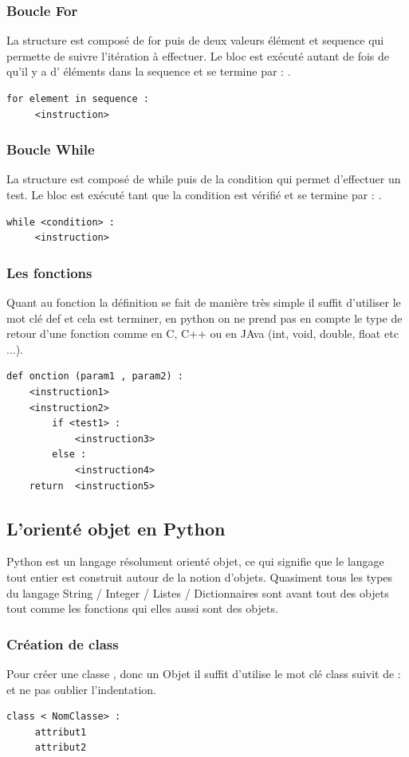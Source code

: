 \documentclass[a4paper, 12pt, twoside]{article}
\begin{document}
{{{{{\subsubsection{ Boucle For}
La structure est composé de for puis de deux valeurs élément et sequence qui permette de suivre l'itération à effectuer. Le bloc est exécuté autant de fois de qu'il y a d' éléments dans la sequence et se termine par  : .
\begin{verbatim}
for element in sequence :
     <instruction>
\end{verbatim}
\subsubsection{ Boucle While }
La structure est composé de while puis de la condition qui permet d'effectuer un test. Le bloc est exécuté tant que la condition est vérifié et se termine par  : .
\begin{verbatim}
while <condition> :
     <instruction>
\end{verbatim}
\subsubsection{ Les fonctions}
Quant au fonction la définition se fait de manière très simple il suffit d'utiliser le mot clé def et cela est terminer, en python on ne prend pas en compte le type de retour d'une fonction comme en C, C++ ou en \textsf{JA}va (int, void, double, float etc ...).
\begin{verbatim}
def onction (param1 , param2) :
    <instruction1>
    <instruction2>
        if <test1> :
            <instruction3>
        else :
            <instruction4>
    return  <instruction5>
\end{verbatim}

\subsection{L'orienté objet en Python}
Python est un langage résolument orienté objet, ce qui signifie que le langage tout entier est construit autour de la notion d’objets. Quasiment tous les types du langage String / Integer / Listes / Dictionnaires  sont avant tout des objets tout comme les fonctions qui elles aussi sont des objets.

\subsubsection{Création de class}{Pour créer une classe , donc un Objet il suffit d'utilise le mot clé class suivit de  :  et ne pas oublier l'indentation.}
\begin{verbatim}
class < NomClasse> : 
     attribut1
     attribut2 
\end{verbatim}

}}}}}
\end{document}
